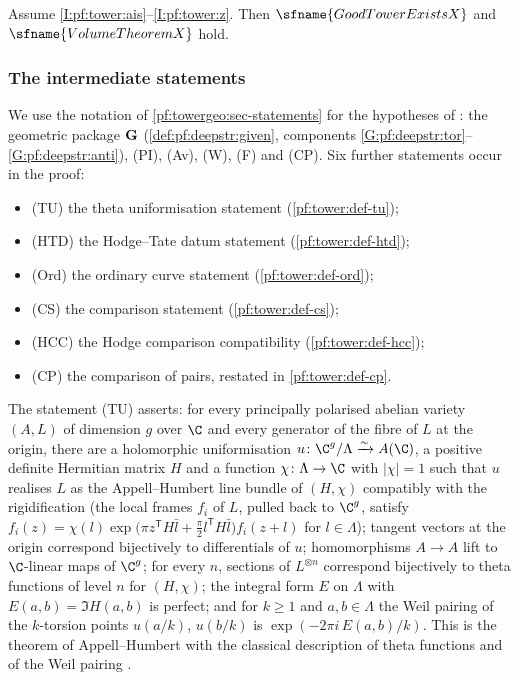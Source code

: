 \begin{theorem}\label{pf:tower:main}
Assume \ref{I:pf:tower:ais}--\ref{I:pf:tower:z}. Then $\sfname{GoodTowerExistsX}$ and
$\sfname{VolumeTheoremX}$ hold.
\end{theorem}

\subsubsection*{The intermediate statements}
We use the notation of \cref{pf:towergeo:sec-statements} for the hypotheses of
: the geometric package $\mathbf G$
(\cref{def:pf:deepstr:given}, components \ref{G:pf:deepstr:tor}--\ref{G:pf:deepstr:anti}), (PI), (Av), (W),
(F) and (CP). Six further statements occur in the proof:
\begin{itemize}
\item (TU) the theta uniformisation statement (\cref{pf:tower:def-tu});
\item (HTD) the Hodge--Tate datum statement (\cref{pf:tower:def-htd});
\item (Ord) the ordinary curve statement (\cref{pf:tower:def-ord});
\item (CS) the comparison statement (\cref{pf:tower:def-cs});
\item (HCC) the Hodge comparison compatibility (\cref{pf:tower:def-hcc});
\item (CP) the comparison of pairs, restated in \cref{pf:tower:def-cp}.
\end{itemize}

\begin{definition}\label{pf:tower:def-tu}
The statement (TU) asserts: for every principally polarised abelian variety $(A,L)$ of dimension $g$ over
$\C$ and every generator of the fibre of $L$ at the origin, there are a holomorphic uniformisation
$u\colon\C^g/\Lambda\xrightarrow{\sim}A(\C)$, a positive definite Hermitian matrix $H$ and a function $\chi\colon\Lambda\to\C$
with $|\chi|=1$ such that $u$ realises $L$ as the Appell--Humbert line bundle of $(H,\chi)$ compatibly with the
rigidification (the local frames $f_i$ of $L$, pulled back to $\C^g$, satisfy
$f_i(z)=\chi(l)\exp\bigl(\pi z^{\mathsf T}H\bar l+\tfrac\pi2 l^{\mathsf T}H\bar l\bigr)f_i(z+l)$ for $l\in\Lambda$);
tangent vectors at the origin correspond bijectively to differentials of $u$; homomorphisms $A\to A$ lift to
$\C$-linear maps of $\C^g$; for every $n$, sections of $L^{\otimes n}$ correspond bijectively to theta functions
of level $n$ for $(H,\chi)$; the integral form $E$ on $\Lambda$ with $E(a,b)=\Im H(a,b)$ is perfect; and for
$k\ge1$ and $a,b\in\Lambda$ the Weil pairing of the $k$-torsion points $u(a/k)$, $u(b/k)$ is
$\exp(-2\pi i\,E(a,b)/k)$. This is the theorem of Appell--Humbert with the classical description of theta
functions and of the Weil pairing \cite[\S\S2--3, \S24]{Mumford1970}.
\end{definition}

